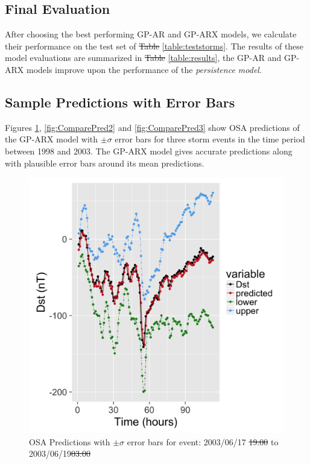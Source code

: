 \documentclass{article}
\providecommand{\DIFadd}[1]{{\protect\color{blue}\uwave{#1}}} %
\providecommand{\DIFdel}[1]{{\protect\color{red}\sout{#1}}}                      %
\providecommand{\DIFaddbegin}{} %
\providecommand{\DIFaddend}{} %
\providecommand{\DIFdelbegin}{} %
\providecommand{\DIFdelend}{} %
\providecommand{\DIFdelFL}[1]{\DIFdel{#1}} %
\providecommand{\DIFdelbeginFL}{} %
\providecommand{\DIFdelendFL}{} %
\newcommand{\DIFscaledelfig}{0.5}
\newlength{\DIFdelgraphicswidth} %
\newlength{\DIFdelgraphicsheight} %
\newcommand{\DIFaddincludegraphics}[2][]{{\color{blue}\fbox{\DIFOincludegraphics[#1]{#2}}}} %
\newcommand{\DIFdelincludegraphics}[2][]{%
\sbox{\DIFdelgraphicsbox}{\DIFOincludegraphics[#1]{#2}}%
\settoboxwidth{\DIFdelgraphicswidth}{\DIFdelgraphicsbox} %
\settoboxtotalheight{\DIFdelgraphicsheight}{\DIFdelgraphicsbox} %
\scalebox{\DIFscaledelfig}{%
\parbox[b]{\DIFdelgraphicswidth}{\usebox{\DIFdelgraphicsbox}\\[-\baselineskip] \rule{\DIFdelgraphicswidth}{0em}}\llap{\resizebox{\DIFdelgraphicswidth}{\DIFdelgraphicsheight}{%
\setlength{\unitlength}{\DIFdelgraphicswidth}%
\begin{picture}(1,1)%
\thicklines\linethickness{2pt} %
{\color[rgb]{1,0,0}\put(0,0){\framebox(1,1){}}}%
{\color[rgb]{1,0,0}\put(0,0){\line( 1,1){1}}}%
{\color[rgb]{1,0,0}\put(0,1){\line(1,-1){1}}}%
\end{picture}%
}\hspace*{3pt}}} %
} %
\DeclareRobustCommand{\DIFaddbegin}{\DIFOaddbegin \let\includegraphics\DIFaddincludegraphics} %
\DeclareRobustCommand{\DIFaddend}{\DIFOaddend \let\includegraphics\DIFOincludegraphics} %
\DeclareRobustCommand{\DIFdelbegin}{\DIFOdelbegin \let\includegraphics\DIFdelincludegraphics} %
\DeclareRobustCommand{\DIFdelend}{\DIFOaddend \let\includegraphics\DIFOincludegraphics} %
\DeclareRobustCommand{\DIFdelbeginFL}{\DIFOdelbeginFL \let\includegraphics\DIFdelincludegraphics} %
\DeclareRobustCommand{\DIFdelendFL}{\DIFOaddendFL \let\includegraphics\DIFOincludegraphics} %
\begin{document}
\subsection*{Final Evaluation}

After choosing the best performing GP-AR and GP-ARX models, we calculate their performance on the test set of \DIFdelbegin \DIFdel{Table }\DIFdelend \DIFaddbegin \DIFadd{table }\DIFaddend \ref{table:teststorms}. The results of these model evaluations are summarized in \DIFdelbegin \DIFdel{Table }\DIFdelend \DIFaddbegin \DIFadd{table }\DIFaddend \ref{table:results}, the GP-AR and GP-ARX models improve upon the performance of the \emph{persistence model}.

\subsection*{Sample Predictions with Error Bars}

Figures \ref{fig:ComparePred1}, \ref{fig:ComparePred2} and \ref{fig:ComparePred3} show OSA predictions of the GP-ARX model with $\pm \sigma$ error bars for three storm events in the time period between 1998 and 2003. The GP-ARX model gives accurate predictions along with plausible error bars around its mean predictions.


\begin{figure}[h]
  \includegraphics[width=\textwidth]{PredictionsModel1/PredErrBars_Storm43.png}
  \caption{OSA Predictions with $\pm \sigma$ error bars for event: 2003/06/17 \DIFdelbeginFL \DIFdelFL{19:00 }\DIFdelendFL to 2003/06/19\DIFdelbeginFL \DIFdelFL{03:00}\DIFdelendFL }
  \label{fig:ComparePred1}
\end{figure}
\end{document}

